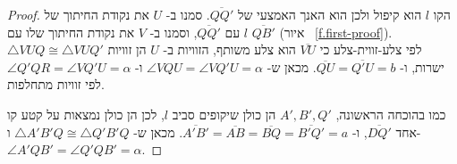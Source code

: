 \begin{proof}
הקו
$l$
הוא קיפול ולכן הוא האנך האמצעי של
$\overline{QQ'}$.
סמנו ב-%
$U$
את נקודת החיתוך של
$l$
עם
$\overline{QQ'}$,
וסמנו ב-%
$V$
את נקודת החיתוך שלו עם
$\overline{QB'}$
(איור%
~\ref{f.first-proof}).
$\triangle VUQ\cong \triangle VUQ'$
לפי צלע-זווית-צלע כי
$\overline{VU}$
הוא צלע משותף, הזוויות ב-%
$U$
הן זוויות ישרות, ו-%
$\overline{QU}=\overline{Q'U}=b$.
מכאן ש-%
$\angle VQU=\angle VQ'U=\alpha$
ו-%
$\angle Q'QR=\angle VQ'U=\alpha$
לפי זוויות מתחלפות.

כמו בהוכחה הראשונה, 
$A', B', Q'$
הן כולן שיקופים סביב
$l$,
לכן הן כולן נמצאות על קטע קו אחד
$\overline{DQ'}$,
ו-%
$\overline{A'B'}=\overline{AB}=\overline{BQ}=\overline{B'Q'}=a$.
מכאן ש-%
$\triangle A'B'Q\cong\triangle Q'B'Q$
ו-%
$\angle A'QB'=\angle Q'QB'=\alpha$.
%
%
%
%
%
%
%
%
%

\end{proof}

